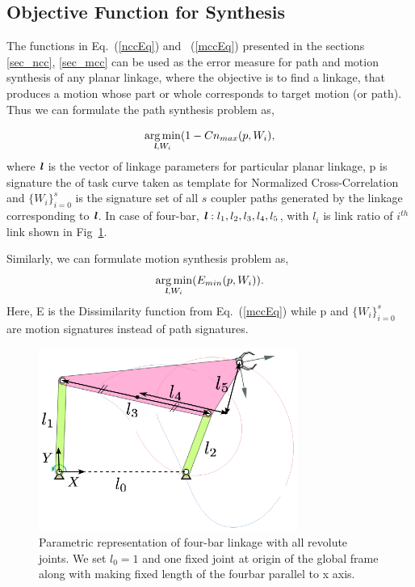 \documentclass[twocolumn,10pt]{asme2e}
\newcommand{\req}[1]{(\ref{#1})}
\DeclareMathOperator*{\argminA}{arg\,min}
\begin{document}
\subsection{Objective Function for Synthesis}
The functions in Eq.~\req{nccEq} and ~\req{mccEq} presented in the sections \ref{sec_ncc}, \ref{sec_mcc} can be used as the error measure for path and motion synthesis of any planar linkage, where the objective is to find a linkage, that produces a motion whose part or whole corresponds to target motion (or path).
Thus we can formulate the path synthesis problem as,

\begin{equation}\label{objectiveFunPath}
  \argminA_{\textbf{\emph{l}}, W_i} (1 - Cn_{max}(p, W_i),
\end{equation}
where $\textbf{\emph{l}}$ is the vector of linkage parameters for particular planar linkage, p is signature the of task curve taken as template for Normalized Cross-Correlation and ${\{W_i\}}_{i=0}^{s}$ is the signature set of all $s$ coupler paths generated by the linkage corresponding to $\textbf{\emph{l}}$.
In case of four-bar, $\textbf{\emph{l}}: l_1, l_2, l_3, l_4, l_5$, with $l_i$ is link ratio of $i^{th}$ link shown in Fig~\ref{fourbar}.

Similarly, we can formulate motion synthesis problem as,
\begin{equation}\label{objectiveFunMotion}
  \argminA_{\textbf{\emph{l}}, W_i} (E_{min}(p, W_i)).
\end{equation}
Here, E is the Dissimilarity function from Eq.~\req{mccEq} while p and ${\{W_i\}}_{i=0}^{s}$ are motion signatures instead of path signatures.

\begin{figure}
\centering
\includegraphics[width=240pt]{figure/fig_fourbar.eps}
  \caption{Parametric representation of four-bar linkage with all revolute joints. We set $l_0 = 1$ and one fixed joint at origin of the global frame along with making fixed length of the fourbar parallel to x axis.}
\label{fourbar}
\end{figure}
\end{document}
